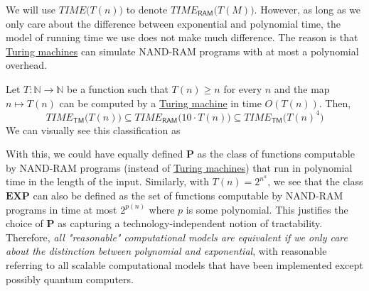   We will use $TIME \big( T(n)\big)$ to denote $TIME_{\mathsf{RAM}} \big(T(M) \big)$. However, as long as we only care about the difference between exponential and polynomial time, the model of running time we use does not make much difference. The reason is that \hyperref[def:turing-machine]{Turing machines} can simulate NAND-RAM programs with at most a polynomial overhead. 

  \begin{theorem}
    \label{thm:relating-ram-and-turing-machines}
  Let $T: \mathbb{N} \to \mathbb{N}$ be a function such that $T(n) \geq n$ for every $n$ and the map $n \mapsto T(n)$ can be computed by a \hyperref[def:turing-machine]{Turing machine} in time $O(T(n))$. Then, 
  \begin{equation}
    TIME_{\mathsf{TM}}\big( T(n)\big) \subseteq TIME_{\mathsf{RAM}}\big( 10 \cdot T(n)\big) \subseteq TIME_{\mathsf{TM}} \big( T(n)^4\big)
  \end{equation}
  We can visually see this classification as 
  \begin{center}
  \end{center}
  \end{theorem}

  With this, we could have equally defined $\mathbf{P}$ as the class of functions computable by NAND-RAM programs (instead of \hyperref[def:turing-machine]{Turing machines}) that run in polynomial time in the length of the input. Similarly, with $T(n) = 2^{n^a}$, we see that the class $\mathbf{EXP}$ can also be defined as the set of functions computable by NAND-RAM programs in time at most $2^{p(n)}$ where $p$ is some polynomial. This justifies the choice of $\mathbf{P}$ as capturing a technology-independent notion of tractability. Therefore, \textit{all "reasonable" computational models are equivalent if we only care about the distinction between polynomial and exponential}, with reasonable referring to all scalable computational models that have been implemented except possibly quantum computers. 

